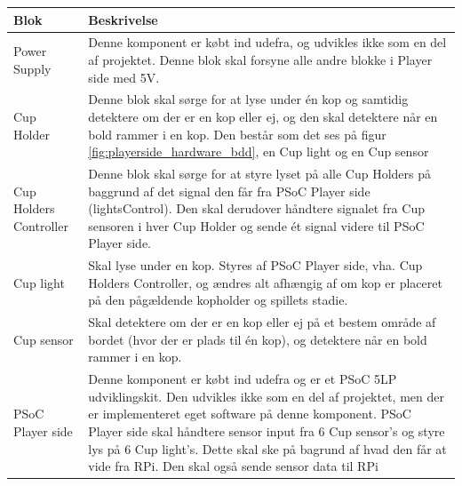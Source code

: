 \documentclass[Arkitektur/System_main.tex]{subfiles}
\begin{document}
\begin{table}[H]
\centering
\begin{tabular}{|L{0.2\columnwidth}|L{0.7\columnwidth}|}
\hline
\textbf{Blok} & \textbf{Beskrivelse} \\ \hline
Power Supply & Denne komponent er købt ind udefra, og udvikles ikke som en del af projektet. Denne blok skal forsyne alle andre blokke i Player side med 5V.\\ \hline 
Cup Holder & Denne blok skal sørge for at lyse under én kop og samtidig detektere om der er en kop eller ej, og den skal detektere når en bold rammer i en kop. Den består som det ses på figur \ref{fig:playerside_hardware_bdd}, en Cup light og en Cup sensor \\ \hline
Cup Holders Controller & Denne blok skal sørge for at styre lyset på alle Cup Holders på baggrund af det signal den får fra PSoC Player side (lightsControl). Den skal derudover håndtere signalet fra Cup sensoren i hver Cup Holder og sende ét signal videre til PSoC Player side. \\ \hline
Cup light & Skal lyse under en kop. Styres af PSoC Player side, vha. Cup Holders Controller, og ændres alt afhængig af om kop er placeret på den pågældende kopholder og spillets stadie.\\ \hline
Cup sensor & Skal detektere om der er en kop eller ej på et bestem område af bordet (hvor der er plads til én kop), og detektere når en bold rammer i en kop.\\ \hline
PSoC Player side & Denne komponent er købt ind udefra og er et PSoC 5LP udviklingskit. Den udvikles ikke som en del af projektet, men der er implementeret eget software på denne komponent. PSoC Player side skal håndtere sensor input fra 6 Cup sensor's og styre lys på 6 Cup light's. Dette skal ske på bagrund af hvad den får at vide fra RPi. Den skal også sende sensor data til RPi\\ \hline
\end{tabular}
\end{table}
\end{document}
